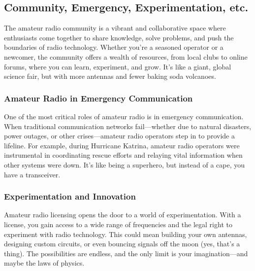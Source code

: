 \subsection{Community, Emergency, Experimentation, etc.}
\label{subsec:why-ham}

The amateur radio community is a vibrant and collaborative space where enthusiasts come together to share knowledge, solve problems, and push the boundaries of radio technology. Whether you're a seasoned operator or a newcomer, the community offers a wealth of resources, from local clubs to online forums, where you can learn, experiment, and grow. It's like a giant, global science fair, but with more antennas and fewer baking soda volcanoes.

\subsubsection*{Amateur Radio in Emergency Communication}
One of the most critical roles of amateur radio is in emergency communication. When traditional communication networks fail—whether due to natural disasters, power outages, or other crises—amateur radio operators step in to provide a lifeline. For example, during Hurricane Katrina, amateur radio operators were instrumental in coordinating rescue efforts and relaying vital information when other systems were down. It's like being a superhero, but instead of a cape, you have a transceiver.


\subsubsection*{Experimentation and Innovation}
Amateur radio licensing opens the door to a world of experimentation. With a license, you gain access to a wide range of frequencies and the legal right to experiment with radio technology. This could mean building your own antennas, designing custom circuits, or even bouncing signals off the moon (yes, that's a thing). The possibilities are endless, and the only limit is your imagination—and maybe the laws of physics.

